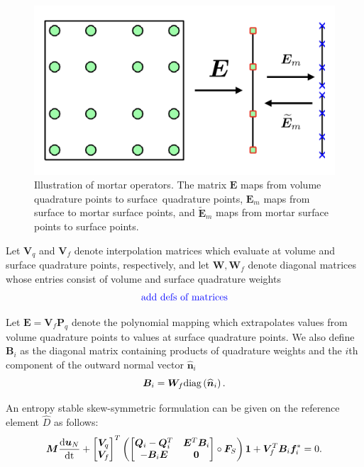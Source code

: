 \documentclass[review]{siamart0216}
\renewcommand{\tilde}{\widetilde}
\renewcommand{\hat}{\widehat}
\newcommand{\td}[2]{\frac{{\rm d}#1}{{\rm d}{\rm #2}}}
\newcommand{\LRp}[1]{\left( #1 \right)}
\newcommand{\note}[1]{{\color{blue}{#1}}}
\newcommand{\diag}[1]{{\rm diag}\LRp{#1}}
\begin{document}
\begin{figure}[!h]
\centering
\includegraphics[width=.65\textwidth]{figs/mortar.png}
\caption{Illustration of mortar operators.  The matrix $\bm{E}$ maps from volume quadrature points to surface quadrature points, $\bm{E}_m$ maps from surface to mortar surface points, and $\tilde{\bm{E}}_m$ maps from mortar surface points to surface points. }
\label{fig:gqcon_noncon}
\end{figure}

Let $\bm{V}_q$ and $\bm{V}_f$ denote interpolation matrices which evaluate at volume and surface quadrature points, respectively, and let $\bm{W}, \bm{W}_f$ denote diagonal matrices whose entries consist of volume and surface quadrature weights
\[
\text{\note{add defs of matrices}}
\]

Let $\bm{E} = \bm{V}_f\bm{P}_q$ denote the polynomial mapping which extrapolates values from volume quadrature points to values at surface quadrature points.  We also define $\bm{B}_i$ as the diagonal matrix containing products of quadrature weights and the $i$th component of the outward normal vector $\hat{\bm{n}}_i$
\[
\bm{B}_i = \bm{W}_f \diag{\hat{\bm{n}}_i}.
\]

An entropy stable skew-symmetric formulation can be given on the reference element $\hat{D}$ as follows:
\[
\bm{M}\td{\bm{u}_N}{t} + \begin{bmatrix} \bm{V}_q \\ \bm{V}_f \end{bmatrix}^T
\LRp{\begin{bmatrix}
\bm{Q}_i-\bm{Q}_i^T & \bm{E}^T\bm{B}_i\\
-\bm{B}_i\bm{E} & \bm{0}
\end{bmatrix} \circ \bm{F}_S}\bm{1} + \bm{V}_f^T\bm{B}_i\bm{f}_i^* = 0.  
\]
\end{document}
